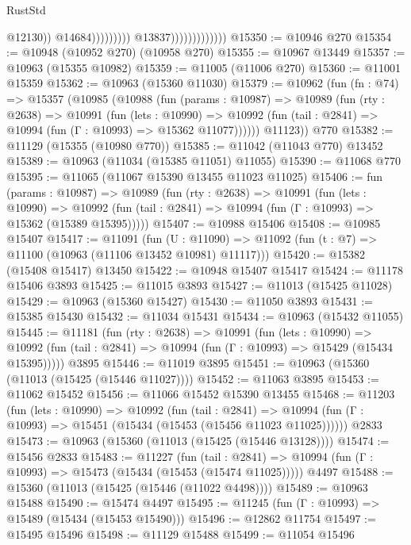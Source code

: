 \begin{lexlean}{RustStd}
\begin{coremodule}
{\begin{coremodule}
{{{{{{{{{{{{{{{{{{{{{{{{{{{{{{{{{                                                    @12130))
                                                @14684)))))))))
                              @13837)))))))))))))
@15350 := @10946 @270
@15354 := @10948 (@10952 @270) (@10958 @270)
@15355 := @10967 @13449
@15357 := @10963 (@15355 @10982)
@15359 := @11005 (@11006 @270)
@15360 := @11001 @15359
@15362 := @10963 (@15360 @11030)
@15379 := @10962
    (fun (fn : @74) =>
    @15357
      (@10985
        (@10988
          (fun (params : @10987) =>
          @10989
            (fun (rty : @2638) =>
            @10991
              (fun (lets : @10990) =>
              @10992 (fun (tail : @2841) => @10994 (fun (Γ : @10993) => @15362 @11077))))))
        @11123))
    @770
@15382 := @11129 (@15355 (@10980 @770))
@15385 := @11042 (@11043 @770) @13452
@15389 := @10963 (@11034 (@15385 @11051) @11055)
@15390 := @11068 @770
@15395 := @11065 (@11067 @15390 @13455 @11023 @11025)
@15406 := fun (params : @10987) =>
  @10989
    (fun (rty : @2638) =>
    @10991
      (fun (lets : @10990) =>
      @10992 (fun (tail : @2841) => @10994 (fun (Γ : @10993) => @15362 (@15389 @15395)))))
@15407 := @10988 @15406
@15408 := @10985 @15407
@15417 := @11091
    (fun (U : @11090) => @11092 (fun (t : @7) => @11100 (@10963 (@11106 @13452 @10981) @11117)))
@15420 := @15382 (@15408 @15417) @13450
@15422 := @10948 @15407 @15417
@15424 := @11178 @15406 @3893
@15425 := @11015 @3893
@15427 := @11013 (@15425 @11028)
@15429 := @10963 (@15360 @15427)
@15430 := @11050 @3893
@15431 := @15385 @15430
@15432 := @11034 @15431
@15434 := @10963 (@15432 @11055)
@15445 := @11181
    (fun (rty : @2638) =>
    @10991
      (fun (lets : @10990) =>
      @10992 (fun (tail : @2841) => @10994 (fun (Γ : @10993) => @15429 (@15434 @15395)))))
    @3895
@15446 := @11019 @3895
@15451 := @10963 (@15360 (@11013 (@15425 (@15446 @11027))))
@15452 := @11063 @3895
@15453 := @11062 @15452
@15456 := @11066 @15452 @15390 @13455
@15468 := @11203
    (fun (lets : @10990) =>
    @10992
      (fun (tail : @2841) =>
      @10994 (fun (Γ : @10993) => @15451 (@15434 (@15453 (@15456 @11023 @11025))))))
    @2833
@15473 := @10963 (@15360 (@11013 (@15425 (@15446 @13128))))
@15474 := @15456 @2833
@15483 := @11227
    (fun (tail : @2841) => @10994 (fun (Γ : @10993) => @15473 (@15434 (@15453 (@15474 @11025)))))
    @4497
@15488 := @15360 (@11013 (@15425 (@15446 (@11022 @4498))))
@15489 := @10963 @15488
@15490 := @15474 @4497
@15495 := @11245 (fun (Γ : @10993) => @15489 (@15434 (@15453 @15490)))
@15496 := @12862 @11754
@15497 := @15495 @15496
@15498 := @11129 @15488
@15499 := @11054 @15496
}}}}}}}}}}}}}}}}}}}}}}}}}}}}}}}}}
\end{coremodule}}
\end{coremodule}
\end{lexlean}
